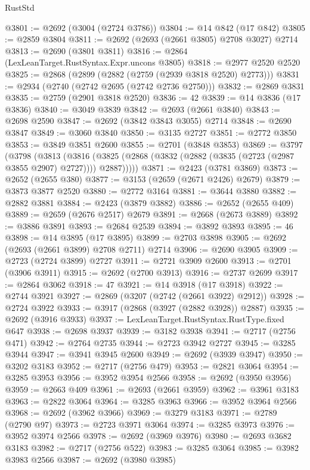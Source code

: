 \begin{lexlean}{RustStd}
\begin{coremodule}
@3801 := @2692 (@3004 (@2724 @3786))
@3804 := @14 @842 (@17 @842)
@3805 := @2859 @3804
@3811 := @2692 (@2693 (@2661 @3805) @2708 @3027) @2714
@3813 := @2690 (@3801 @3811)
@3816 := @2864 (LexLeanTarget.RustSyntax.Expr.uncons @3805)
@3818 := @2977 @2520 @2520
@3825 := @2868 (@2899 (@2882 (@2759 (@2939 @3818 @2520) @2773)))
@3831 := @2934 (@2740 (@2742 @2695 (@2742 @2736 @2750)))
@3832 := @2869 @3831
@3835 := @2759 (@2901 @3818 @2520)
@3836 := 42
@3839 := @14 @3836 (@17 @3836)
@3840 := @3049 @3839
@3842 := @2693 (@2661 @3840)
@3843 := @2698 @2590
@3847 := @2692 (@3842 @3843 @3055) @2714
@3848 := @2690 @3847
@3849 := @3060 @3840
@3850 := @3135 @2727
@3851 := @2772 @3850
@3853 := @3849 @3851 @2600
@3855 := @2701 (@3848 @3853)
@3869 := @3797
    (@3798
      (@3813
        (@3816 (@3825 (@2868 (@3832 (@2882 (@3835 (@2723 (@2987 @3855 @2907) @2727)))) @2887)))))
@3871 := @2423 (@3781 @3869)
@3873 := @2652 (@2655 @380)
@3877 := @3153 (@2659 (@2671 @2426) @2679)
@3879 := @3873 @3877 @2520
@3880 := @2772 @3164
@3881 := @3644 @3880
@3882 := @2882 @3881
@3884 := @2423 (@3879 @3882)
@3886 := @2652 (@2655 @409)
@3889 := @2659 (@2676 @2517) @2679
@3891 := @2668 (@2673 @3889)
@3892 := @3886 @3891
@3893 := @2684 @2539
@3894 := @3892 @3893
@3895 := 46
@3898 := @14 @3895 (@17 @3895)
@3899 := @2703 @3898
@3905 := @2692 (@2693 (@2661 @3899) @2708 @2711) @2714
@3906 := @2690 @3905
@3909 := @2723 (@2724 @3899) @2727
@3911 := @2721 @3909 @2600
@3913 := @2701 (@3906 @3911)
@3915 := @2692 (@2700 @3913)
@3916 := @2737 @2699
@3917 := @2864 @3062
@3918 := 47
@3921 := @14 @3918 (@17 @3918)
@3922 := @2744 @3921
@3927 := @2869 (@3207 (@2742 (@2661 @3922) @2912))
@3928 := @2724 @3922
@3933 := @3917 (@2868 (@3927 (@2882 @3928)) @2887)
@3935 := @2692 (@3916 @3933)
@3937 := LexLeanTarget.RustSyntax.RustType.fixed @647
@3938 := @2698 @3937
@3939 := @3182 @3938
@3941 := @2717 (@2756 @471)
@3942 := @2764 @2735
@3944 := @2723 @3942 @2727
@3945 := @3285 @3944
@3947 := @3941 @3945 @2600
@3949 := @2692 (@3939 @3947)
@3950 := @3202 @3183
@3952 := @2717 (@2756 @479)
@3953 := @2821 @3064
@3954 := @3285 @3953
@3956 := @3952 @3954 @2566
@3958 := @2692 (@3950 @3956)
@3959 := @2663 @409
@3961 := @2693 (@2661 @3959)
@3962 := @3961 @3183
@3963 := @2822 @3064
@3964 := @3285 @3963
@3966 := @3952 @3964 @2566
@3968 := @2692 (@3962 @3966)
@3969 := @3279 @3183
@3971 := @2789 (@2790 @97)
@3973 := @2723 @3971 @3064
@3974 := @3285 @3973
@3976 := @3952 @3974 @2566
@3978 := @2692 (@3969 @3976)
@3980 := @2693 @3682 @3183
@3982 := @2717 (@2756 @522)
@3983 := @3285 @3064
@3985 := @3982 @3983 @2566
@3987 := @2692 (@3980 @3985)

\end{coremodule}
\end{lexlean}
